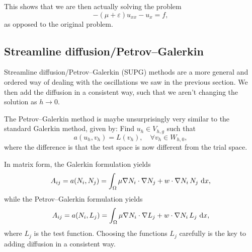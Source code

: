 This shows that we are then actually solving the problem
\begin{equation}
    -(\mu + \varepsilon) u_{xx} - u_x = f,
\end{equation}
as opposed to the original problem.

\subsection{Streamline diffusion/Petrov--Galerkin} %
Streamline diffusion/Petrov--Galerkin (SUPG) methods are a more general and ordered way of dealing with the oscillations we saw in the previous section. %
We then add the diffusion in a consistent way, such that we aren't changing the solution as $h \to 0$.

The Petrov--Galerkin method is maybe unsurprisingly very similar to the standard Galerkin method, given by: %
Find $u_h \in V_{h,g}$ such that
\begin{equation}
    a(u_h, v_h) = L(v_h), \quad \forall v_h \in W_{h, 0},
\end{equation}
where the difference is that the test space is now different from the trial space.

In matrix form, the Galerkin formulation yields
\begin{equation}
    A_{ij} = a(N_i, N_j) = \int_{\Omega} \mu \nabla N_i \cdot \nabla N_j + w \cdot \nabla N_i \, N_j \, \mathop{}\!\mathrm{d} x,
\end{equation}
while the Petrov--Galerkin formulation yields %
\begin{equation}
    A_{ij} = a(N_i, L_j) = \int_{\Omega} \mu \nabla N_i \cdot \nabla L_j + w \cdot \nabla N_i \, L_j \, \mathop{}\!\mathrm{d} x,
\end{equation}
where $L_j$ is the test function.
Choosing the functions $L_j$ carefully is the key to adding diffusion in a consistent way.

